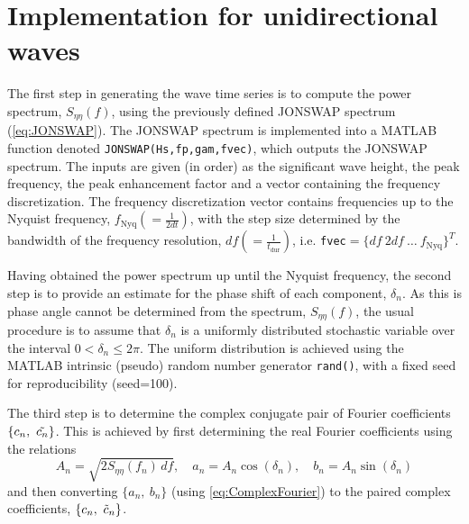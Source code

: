 \section{Implementation for unidirectional waves}

The first step in generating the wave time series is to compute the power spectrum, $S_{\eta \eta}(f)$, using the previously defined JONSWAP spectrum (\cref{eq:JONSWAP}). The JONSWAP spectrum is implemented into a MATLAB function denoted \verb+JONSWAP(Hs,fp,gam,fvec)+, which outputs the JONSWAP spectrum. The inputs are given (in order) as the significant wave height, the peak frequency, the peak enhancement factor and a vector containing the frequency discretization. The frequency discretization vector contains frequencies up to the Nyquist frequency, $f_{\text{Nyq}}(=\frac{1}{2dt})$, with the step size determined by the bandwidth of the frequency resolution, $df(=\frac{1}{t_{\text{dur}}})$, i.e. \verb+fvec+$=\{df\ 2df \ \dots \ f_{\text{Nyq}}\}^T$.

Having obtained the power spectrum up until the Nyquist frequency, the second step is to provide an estimate for the phase shift of each component, $\delta_n$. As this is phase angle cannot be determined from the spectrum, $S_{\eta \eta}(f)$, the usual procedure is to assume that $\delta_n$ is a uniformly distributed stochastic variable over the interval $0<\delta_n\leq 2\pi$. The uniform distribution is achieved using the MATLAB intrinsic (pseudo) random number generator \verb+rand()+, with a fixed seed for reproducibility (seed=100).

The third step is to determine the complex conjugate pair of Fourier coefficients $\{c_n,\ \Tilde{c_n}\}$. This is achieved by first determining the real Fourier coefficients using the relations
\begin{equation}
    A_n = \sqrt{2 S_{\eta \eta}(f_n)\,df}, \quad a_n=A_n\cos{(\delta_n)}, \quad b_n=A_n\sin{(\delta_n)}
\end{equation}
and then converting $\{a_n,\ b_n \}$ (using \cref{eq:ComplexFourier}) to the paired complex coefficients, $\{c_n,\ \Tilde{c}_n\}$.

